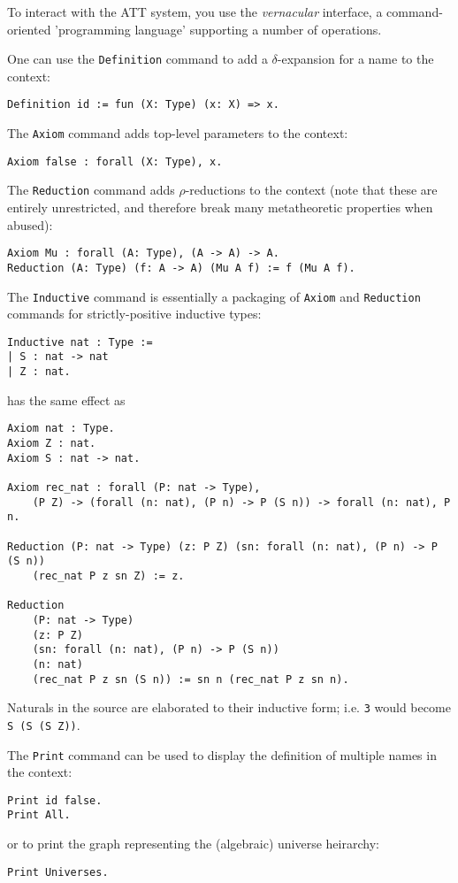\documentclass{article}
\begin{document}
To interact with the ATT system, you use the \emph{vernacular} interface, a command-oriented 'programming language' supporting a number of operations.

One can use the \texttt{Definition} command to add a $\delta$-expansion for a name to the context:
\begin{lstlisting}
Definition id := fun (X: Type) (x: X) => x.
\end{lstlisting}

The \texttt{Axiom} command adds top-level parameters to the context:
\begin{lstlisting}
Axiom false : forall (X: Type), x.
\end{lstlisting}

The \texttt{Reduction} command adds $\rho$-reductions to the context (note that these are entirely unrestricted, and therefore break many metatheoretic properties when abused):
\begin{lstlisting}
Axiom Mu : forall (A: Type), (A -> A) -> A.
Reduction (A: Type) (f: A -> A) (Mu A f) := f (Mu A f).
\end{lstlisting}

The \texttt{Inductive} command is essentially a packaging of \texttt{Axiom} and \texttt{Reduction} commands for strictly-positive inductive types:
\begin{lstlisting}
Inductive nat : Type :=
| S : nat -> nat
| Z : nat.
\end{lstlisting}
has the same effect as
\begin{lstlisting}
Axiom nat : Type.
Axiom Z : nat.
Axiom S : nat -> nat.

Axiom rec_nat : forall (P: nat -> Type),
    (P Z) -> (forall (n: nat), (P n) -> P (S n)) -> forall (n: nat), P n.

Reduction (P: nat -> Type) (z: P Z) (sn: forall (n: nat), (P n) -> P (S n))
    (rec_nat P z sn Z) := z.

Reduction
    (P: nat -> Type)
    (z: P Z)
    (sn: forall (n: nat), (P n) -> P (S n))
    (n: nat)
    (rec_nat P z sn (S n)) := sn n (rec_nat P z sn n).
\end{lstlisting}
Naturals in the source are elaborated to their inductive form; i.e. \texttt{3} would become \texttt{S (S (S Z))}.

The \texttt{Print} command can be used to display the definition of multiple names in the context:
\begin{lstlisting}
Print id false.
Print All.
\end{lstlisting}
or to print the graph representing the (algebraic) universe heirarchy:
\begin{lstlisting}
Print Universes.
\end{lstlisting}
\end{document}
